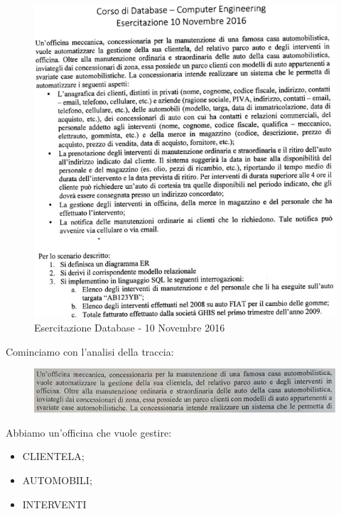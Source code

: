 \begin{center}
\begin{figure}[H]
\centering
\includegraphics[scale=0.8]{figures/10112016.png}
\caption{Esercitazione Database - 10 Novembre 2016} 
\end{figure}
\end{center}

Cominciamo con l’analisi della traccia:

\begin{center}
\begin{figure}[H]
\centering
\includegraphics[scale=0.8]{figures/101120161.png}
\end{figure}
\end{center}

Abbiamo un’officina che vuole gestire:

\begin{itemize}

\item CLIENTELA;
\item AUTOMOBILI;
\item INTERVENTI 

\end{itemize}

